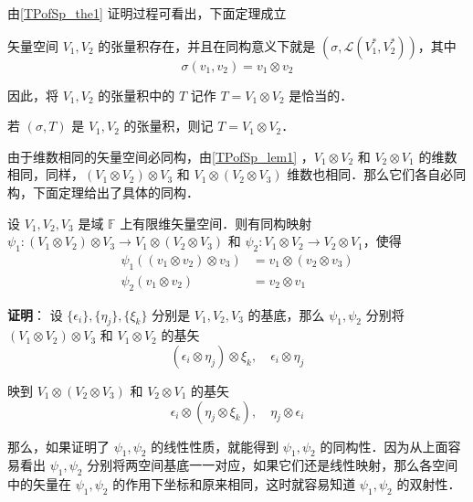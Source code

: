 由\autoref{TPofSp_the1} 证明过程可看出，下面定理成立
\begin{theorem}{}
矢量空间 $V_1,V_2$ 的张量积存在，并且在同构意义下就是 $(\sigma,\mathcal L(V_1^*,V_2^*))$，其中
\begin{equation}
\sigma(v_1,v_2)=v_1\otimes v_2
\end{equation}
\end{theorem}
 
 因此，将 $V_1,V_2$ 的张量积中的 $T$ 记作 $T=V_1\otimes V_2$ 是恰当的．

\begin{definition}{}
若 $(\sigma ,T)$ 是 $V_1,V_2$ 的张量积，则记 $T=V_1\otimes V_2$．
\end{definition}

由于维数相同的矢量空间必同构，由\autoref{TPofSp_lem1} ，$V_1\otimes V_2$ 和 $V_2\otimes V_1$ 的维数相同，同样，$(V_1\otimes V_2)\otimes V_3$ 和 $V_1\otimes( V_2\otimes V_3)$ 维数也相同．那么它们各自必同构，下面定理给出了具体的同构．
\begin{theorem}{}\label{TPofSp_the2}
设 $V_1,V_2,V_3$ 是域 $\mathbb F$ 上有限维矢量空间．则有同构映射 $\psi_1:(V_1\otimes V_2)\otimes V_3\rightarrow V_1\otimes(V_2\otimes V_3)$ 和 $\psi_2:V_1\otimes V_2\rightarrow V_2\otimes V_1$，使得
\begin{equation}
\begin{aligned}
\psi_1((v_1\otimes v_2)\otimes v_3)&=v_1\otimes(v_2\otimes v_3)\\
\psi_2(v_1\otimes v_2)&=v_2\otimes v_1
\end{aligned}
\end{equation}
\end{theorem}
\textbf{证明}： 设 $\{\epsilon_i\},\{\eta_j\},\{\xi_k\}$ 分别是 $V_1,V_2,V_3$ 的基底，那么 $\psi_1,\psi_2$ 分别将 $(V_1\otimes V_2)\otimes V_3$ 和 $V_1\otimes V_2$ 的基矢
\begin{equation}
(\epsilon_i\otimes\eta_j)\otimes\xi_k,\quad \epsilon_i\otimes\eta_j
\end{equation}

映到 $V_1\otimes (V_2\otimes V_3)$ 和 $V_2\otimes V_1$ 的基矢 
\begin{equation}
\epsilon_i\otimes(\eta_j\otimes\xi_k),\quad \eta_j\otimes\epsilon_i
\end{equation}

那么，如果证明了 $\psi_1,\psi_2$ 的线性性质，就能得到 $\psi_1,\psi_2$ 的同构性．因为从上面容易看出 $\psi_1,\psi_2$ 分别将两空间基底一一对应，如果它们还是线性映射，那么各空间中的矢量在 $\psi_1,\psi_2$ 的作用下坐标和原来相同，这时就容易知道 $\psi_1,\psi_2$ 的双射性．

